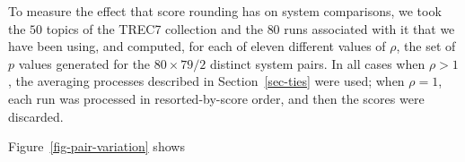To measure the effect that score rounding has on system comparisons,
we took the $50$ topics of the TREC7 collection and the $80$ runs
associated with it that we have been using, and computed, for each of
eleven different values of $\rho$, the set of $p$ values generated
for the $80\times79/2$ distinct system pairs.
In all cases when $\rho>1$, the averaging processes described in
Section~\ref{sec-ties} were used; when $\rho=1$, each run was
processed in resorted-by-score order, and then the scores were
discarded.

Figure~\ref{fig-pair-variation} shows {}
